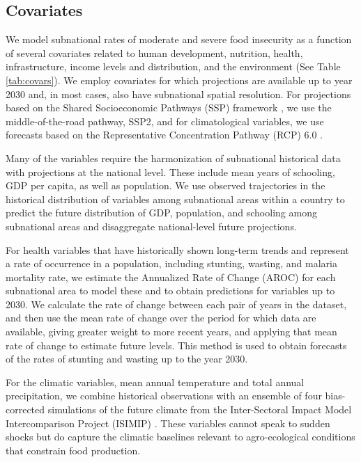 \documentclass[titlepage]{article}
\begin{document}
\subsection{Covariates}
We model subnational rates of moderate and severe food insecurity as a function of several covariates related to human development, nutrition, health, infrastructure, income levels and distribution, and the environment (See Table \ref{tab:covars}).  We employ covariates for which projections are available up to year 2030 and, in most cases, also have subnational spatial resolution.  For projections based on the Shared Socioeconomic Pathways (SSP) framework \citep{oneill2014new}, we use the middle-of-the-road pathway, SSP2, and for climatological variables, we use forecasts based on the Representative Concentration Pathway (RCP) 6.0 \citep{van2011representative}. 

Many of the variables require the harmonization of subnational historical data with projections at the national level.  These include mean years of schooling, GDP per capita, as well as population. We use observed trajectories in the historical distribution of variables among subnational areas within a country to predict the future distribution of GDP, population, and schooling among subnational areas and disaggregate national-level future projections.

For health variables that have historically shown long-term trends and represent a rate of occurrence in a population, including stunting, wasting, and malaria mortality rate, we estimate the Annualized Rate of Change (AROC) for each subnational area to model these and to obtain predictions for variables up to 2030. We calculate the rate of change between each pair of years in the dataset, and then use the mean rate of change over the period for which data are available, giving greater weight to more recent years, and applying that mean rate of change to estimate future levels.  This method is used to obtain forecasts of the rates of stunting and wasting up to the year 2030.

For the climatic variables, mean annual temperature and total annual precipitation, we combine historical observations with an ensemble of four bias-corrected simulations of the future climate from the Inter-Sectoral Impact Model Intercomparison Project (ISIMIP) \citep{warszawski2014inter}.  These variables cannot speak to sudden shocks but do capture the climatic baselines relevant to agro-ecological conditions that constrain food production.
\end{document}
